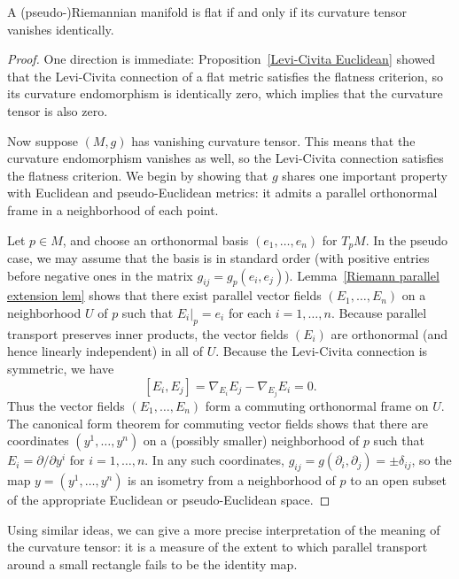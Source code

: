 \begin{theorem}
A (pseudo-)Riemannian manifold is flat if and only if its curvature tensor vanishes identically.
\end{theorem}
\begin{proof}
One direction is immediate: Proposition~\ref{Levi-Civita Euclidean} showed that the Levi-Civita connection of a flat metric satisfies the flatness criterion, so its 
curvature endomorphism is identically zero, which implies that the curvature tensor is also zero.\par
Now suppose $(M,g)$ has vanishing curvature tensor. This means that the curvature endomorphism vanishes as well, so the Levi-Civita connection satisfies the flatness 
criterion. We begin by showing that $g$ shares one important property with Euclidean and pseudo-Euclidean metrics: it admits a parallel orthonormal frame in a neighborhood of each point.\par
Let $p\in M$, and choose an orthonormal basis $(e_1,\dots,e_n)$ for $T_pM$. In the pseudo case, we may assume that the basis is in standard order (with positive entries before negative ones in the matrix $g_{ij}=g_p(e_i,e_j)$). Lemma~\ref{Riemann parallel extension lem} shows that there exist parallel vector fields $(E_1,\dots,E_n)$ on a neighborhood $U$ of $p$ such that $E_i|_p=e_i$ for each $i=1,\dots,n$. Because parallel transport preserves inner products, the vector fields $(E_i)$ are orthonormal (and hence linearly independent) in all of $U$. Because the Levi-Civita connection is symmetric, we have
\[[E_i,E_j]=\nabla_{E_i}E_j-\nabla_{E_j}E_i=0.\]
Thus the vector fields $(E_1,\dots,E_n)$ form a commuting orthonormal frame on $U$. The canonical form theorem for commuting vector fields shows that there are coordinates $(y^1,\dots,y^n)$ on a (possibly smaller) neighborhood of $p$ such that $E_i=\partial/\partial y^i$ for $i=1,\dots,n$. In any such coordinates, $g_{ij}=g(\partial_i,\partial_j)=\pm\delta_{ij}$, so the map $y=(y^1,\dots,y^n)$ is an isometry from a neighborhood of $p$ to an open subset of the appropriate  Euclidean or pseudo-Euclidean space.
\end{proof}
Using similar ideas, we can give a more precise interpretation of the meaning of the curvature tensor: it is a measure of the extent to which parallel transport around a small rectangle fails to be the identity map.
